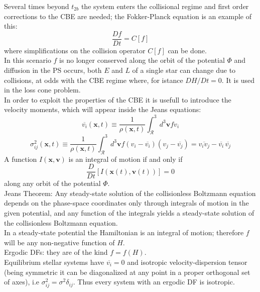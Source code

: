 Several times beyond $t_{2b}$ the system enters the collisional regime and first order 
corrections to the CBE are needed; the Fokker-Planck equation is an example of this:
\begin{equation}
    \frac{Df}{Dt}=C[f]
\end{equation}
where simplifications on the collision operator $C[f]$ can be done.\\In this scenario $f$ is 
no longer conserved along the orbit of the potential $\Phi$ and diffusion in the PS occurs, 
both $E$ and $L$ of a single star can change due to collisions, at odds with the CBE regime 
where, for istance $DH/Dt=0$. It is used in the loss cone problem.\\In order to exploit the 
properties of the CBE it is usefull to introduce the velocity moments, which will appear 
inside the Jeans equations:
\begin{equation}
    \overline{v_i}(\mathbf{x},t)\equiv 
    \frac{1}{\rho(\mathbf{x},t)}\int_\mathcal{R}^3 d^3 \mathbf{v} f v_i
\end{equation}
\begin{equation}
    \sigma_{ij}^2(\mathbf{x},t)\equiv 
    \frac{1}{\rho(\mathbf{x},t)}\int_\mathcal{R}^3 d^3 \mathbf{v}
    f (v_i-\overline{v_i})(v_j-\overline{v_j})=\overline{v_iv_j}-
    \overline{v_i}\,\overline{v_j}
\end{equation}
A function $I(\mathbf{x},\mathbf{v})$
is an integral of motion if and only if
\begin{equation}\label{Integral of motion def}
    \frac{D}{Dt}[I(\mathbf{x}(t),\mathbf{v}(t))]=0
\end{equation}
along any orbit of the potential $\Phi$.
\\Jeans Theorem: 
Any steady-state solution of the collisionless Boltzmann equation depends on 
the phase-space coordinates only through integrals of motion in the given potential, and any 
function of the integrals yields a steady-state solution of the collisionless Boltzmann 
equation.\\In a steady-state potential the Hamiltonian is an integral of motion; therefore $f$
will be any non-negative function of $H$.
\\Ergodic DFs: they are of the kind $f=f(H)$.
\\Equilibrium stellar systems have $\overline{v_i}=0$ and isotropic velocity-dispersion tensor
(being symmetric it can be diagonalized at any point in a proper orthogonal set of axes), i.e 
$\sigma^2_{ij}=\sigma^2 \delta_{ij}$. Thus every system with an ergodic DF is isotropic.

